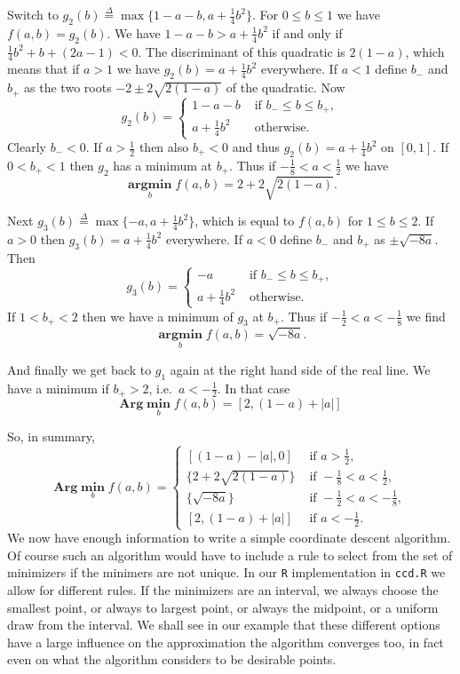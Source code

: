 \documentclass[
  12pt,
]{book}
\begin{document}
Switch to \(g_2(b)\mathop{=}\limits^{\Delta}\max\{1-a-b,a+\frac14 b^2\}\). For \(0\leq b\leq 1\) we have \(f(a,b)=g_2(b)\). We have \(1-a-b>a+\frac14 b^2\) if and only if \(\frac14 b^2+b+(2a-1)<0\). The discriminant of this quadratic is \(2(1-a)\), which means that
if \(a>1\) we have \(g_2(b)=a+\frac14 b^2\) everywhere. If \(a<1\) define \(b_-\) and \(b_+\)
as the two roots \(-2\pm 2\sqrt{2(1-a)}\) of the quadratic. Now
\[
g_2(b)=
\begin{cases}
1-a-b&\text{ if }b_-\leq b\leq b_+,\\
a+\frac14 b^2&\text{ otherwise}.
\end{cases}
\]
Clearly \(b_-<0\). If \(a>\frac12\) then also \(b_+<0\) and thus \(g_2(b)=a+\frac14 b^2\)
on \([0,1]\). If \(0<b_+<1\) then \(g_2\) has a minimum at \(b_+\). Thus if \(-\frac18<a<\frac12\) we have
\[
\mathop{\mathbf{argmin}}\limits_{b} f(a,b)=2+2\sqrt{2(1-a)}.
\]

Next \(g_3(b)\mathop{=}\limits^{\Delta}\max\{-a,a+\frac14 b^2\}\), which is equal to \(f(a,b)\) for \(1\le b\leq 2\). If \(a>0\) then \(g_3(b)=a+\frac14 b^2\) everywhere. If \(a<0\) define \(b_-\) and \(b_+\) as \(\pm\sqrt{-8a}\). Then
\[
g_3(b)=
\begin{cases}
-a&\text{ if }b_-\leq b\leq b_+,\\
a+\frac14 b^2&\text{ otherwise}.
\end{cases}
\]
If \(1<b_+<2\) then we have a minimum of \(g_3\) at \(b_+\). Thus
if \(-\frac12<a<-\frac18\) we find
\[
\mathop{\mathbf{argmin}}\limits_{b} f(a,b)=\sqrt{-8a}.
\]

And finally we get back to \(g_1\) again at the right hand side of the real line. We have a minimum if \(b_+>2\), i.e.~\(a<-\frac12\). In that case
\[
\mathbf{Arg}\mathop{\mathbf{min}}\limits_{b} f(a,b)=[2,(1-a)+|a|]
\]

So, in summary,
\[
\mathbf{Arg}\mathop{\mathbf{min}}\limits_{b} f(a,b)=\begin{cases}
[(1-a)-|a|,0]&\text{ if }a>\frac12,\\
\{2+2\sqrt{2(1-a)}\}&\text{ if }-\frac18<a<\frac12,\\
\{\sqrt{-8a}\}&\text{ if }-\frac12<a<-\frac18,\\
[2,(1-a)+|a|]&\text{ if }a<-\frac12.
\end{cases}
\]
We now have enough information to write a simple coordinate descent algorithm. Of course such an algorithm would have to include a rule to select from the set of minimizers if the minimers are not unique. In our \texttt{R} implementation in \texttt{ccd.R} we allow for different rules. If the minimizers are an interval, we always choose the smallest point, or always to largest point, or always the midpoint, or a uniform draw from the interval. We shall see in our example that these
different options have a large influence on the approximation the algorithm converges too, in fact even on what the algorithm considers to be desirable points.
\end{document}
